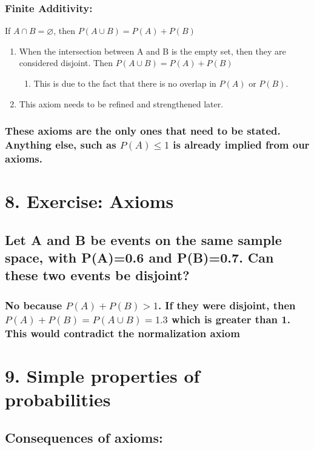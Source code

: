 \documentclass[11pt]{article}
\begin{document}
\subsubsection{Finite Additivity:}
\label{sec:org3b67d0b}
If \(A \cap B = \varnothing\), then \(P(A \cup B)=P(A)+P(B)\)
\begin{enumerate}
\item When the intersection between A and B is the empty set, then they are considered disjoint. Then \(P(A\cup B)=P(A)+P(B)\)
\label{sec:orgc7f0150}
\begin{enumerate}
\item This is due to the fact that there is no overlap in \(P(A)\) or \(P(B)\).
\label{sec:org0a9e0cd}
\end{enumerate}
\item This axiom needs to be refined and strengthened later.
\label{sec:org6369478}
\end{enumerate}
\subsubsection{These axioms are the only ones that need to be stated. Anything else, such as \(P(A)\leq 1\) is already implied from our axioms.}
\label{sec:org6ce1b93}
\section{8. Exercise: Axioms}
\label{sec:orgb57e900}
\subsection{Let A and B be events on the same sample space, with P(A)=0.6 and P(B)=0.7. Can these two events be disjoint?}
\label{sec:org940ee92}
\subsubsection{No because \(P(A)+P(B)>1\). If they were disjoint, then \(P(A)+P(B)=P(A\cup B)=1.3\) which is greater than 1. This would contradict the normalization axiom}
\label{sec:orgc26d6e7}
\section{9. Simple properties of probabilities}
\label{sec:orga327be0}
\subsection{Consequences of axioms:}
\label{sec:org0d62d97}
\end{document}
